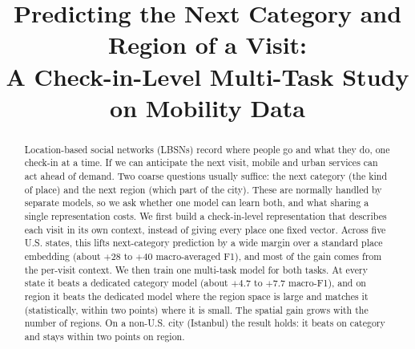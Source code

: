 \documentclass[conference]{IEEEtran}
\begin{document}
\title{Predicting the Next Category and Region of a Visit:\\
A Check-in-Level Multi-Task Study on Mobility Data}

\author{
}

\maketitle

\begin{abstract}
Location-based social networks (LBSNs) record where people go and what they
do, one check-in at a time. If we can anticipate the next visit, mobile and
urban services can act ahead of demand. Two coarse questions usually suffice:
the next category (the kind of place) and the next region (which part of the
city). These are normally handled by separate models, so we ask whether one
model can learn both, and what sharing a single representation costs. We first
build a check-in-level representation that describes each visit in its own
context, instead of giving every place one fixed vector. Across five U.S.
states, this lifts next-category prediction by a wide margin over a standard
place embedding \cite{huang2023hgi} (about $+28$ to $+40$ macro-averaged F1),
and most of the gain comes from the per-visit context. We then train one
multi-task model for both tasks. At every state it beats a dedicated category
model (about $+4.7$ to $+7.7$ macro-F1), and on region it beats the dedicated
model where the region space is large and matches it (statistically, within two
points) where it is small. The spatial gain grows with the number of regions.
On a non-U.S. city (Istanbul) the result holds: it beats on category and stays
within two points on region.
\end{abstract}
\end{document}
